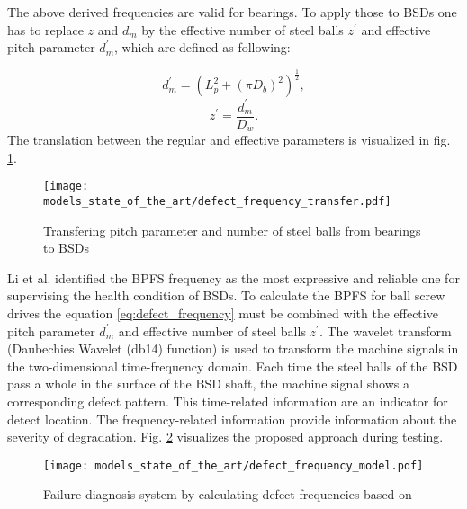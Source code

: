 The above derived frequencies are valid for bearings. To apply those to BSDs one has to replace $z$ and $d_{m}$ by the effective number of steel balls $z^{'}$ and effective pitch parameter $d_{m}^{'}$, which are defined as following:

\begin{equation}
    d_{m}^{'} = (L_{p}^{2}+(\pi D_{b})^{2})^{\frac{1}{2}},
\end{equation}
\begin{equation}
    z^{'} = \frac{d_{m}^{'}}{D_{w}}.
\end{equation}
The translation between the regular and effective parameters is visualized in fig. \ref{fig:defect_frequency_transfer}. 

\begin{figure}[H]
  \centering
  \texttt{[image: models\_state\_of\_the\_art/defect\_frequency\_transfer.pdf]}
  \caption{Transfering pitch parameter and number of steel balls from bearings to BSDs \cite{Lee2015}}
  \label{fig:defect_frequency_transfer}
\end{figure}

Li et al. identified the BPFS frequency as the most expressive and reliable one for supervising the health condition of BSDs. To calculate the BPFS for ball screw drives the equation \ref{eq:defect_frequency} must be combined with the effective pitch parameter $d_{m}^{'}$ and effective number of steel balls $z^{'}$. The wavelet transform (Daubechies Wavelet (db14) function) is used to transform the machine signals in the two-dimensional time-frequency domain. Each time the steel balls of the BSD pass a whole in the surface of the BSD shaft, the machine signal shows a corresponding defect pattern. This time-related information are an indicator for detect location. The frequency-related information provide information about the severity of degradation. Fig. \ref{fig:defect_frequency_model} visualizes the proposed approach during testing.

\begin{figure}[H]
  \centering
  \texttt{[image: models\_state\_of\_the\_art/defect\_frequency\_model.pdf]}
  \caption{Failure diagnosis system by calculating defect frequencies based on \cite{Lee2015}}
  \label{fig:defect_frequency_model}
\end{figure}


